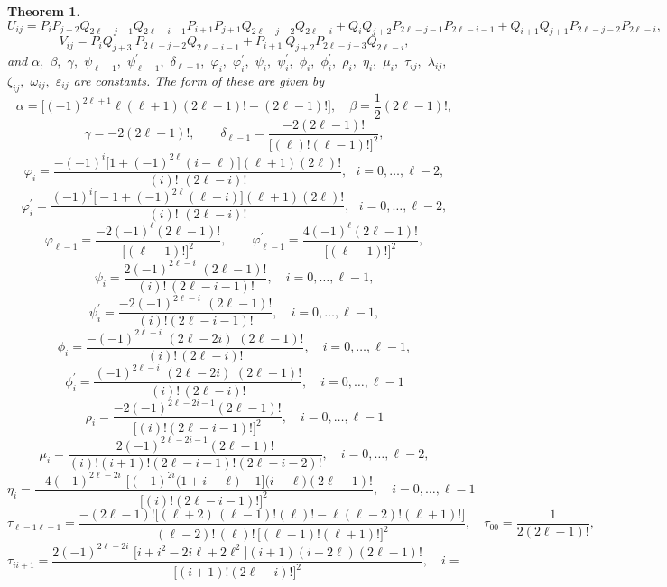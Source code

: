 \documentclass[12pt]{article}
\newtheorem{thm}{Theorem}
\begin{document}
\begin{thm}
$$$$
$$
U_{ij}=P_{i} P_{j+2}  Q_{2\ell-j-1} Q_{2\ell-i-1} 
P_{i+1} P_{j+1} Q_{2\ell-j-2} Q_{2\ell-i}+ Q_{i} Q_{j+2} P_{2\ell-j-1} P_{2\ell-i-1} 
+ Q_{i+1} Q_{j+1} P_{2\ell-j-2} P_{2\ell-i}, 
$$
$$
V_{ij}=P_{i} Q_{j+3} \ P_{2\ell-j-2} Q_{2\ell-i-1} +P_{i+1} \ Q_{j+2} P_{2\ell-j-3} Q_{2\ell-i}, 
$$
and
$\alpha,$ $\beta,$ $\gamma,$ $\psi_{\ell -1},$ $\psi^{'}_{\ell -1},$ $
	\delta_{\ell -1},$ $\varphi_{i},$ $\varphi^{'}_{i},$ $\psi_{i},$
	$\psi^{'}_{i},$ $\phi_{i},$ $\phi^{'}_{i},$ $\rho_{i},$ $\eta_{i},$
	$\mu_{i},$ $\tau_{ij},$ $\lambda_{ij},$ $\zeta_{ij},$ $\omega_{ij},$
	$\varepsilon_{ij}$ are constants. The form of these are given by 
$$
 \alpha = \Big[  (-1)^{2\ell+1} \ell(\ell+1) (2\ell-1)!-(2\ell-1)!  \Big], \quad  \beta = \frac{1}{2}   (2\ell-1)!,
	$$
	$$
 \gamma = -2  (2\ell-1)! , \qquad \delta_{\ell-1} =\frac{ -2 (2\ell-1)! }{\Big [(\ell)!(\ell-1)!\Big]^2} , 
$$
$$
   \varphi_{i}= \frac{ -(-1)^{i} \Big[ 1+(-1)^{2\ell}(i-\ell)  \Big](\ell+1)
	(2\ell)! }{ (i)!\,\, (2\ell-i)!},\,\,\,\,  i= 0,\ldots, \ell-2,  
$$
$$
   \varphi^{'}_{i}= \frac{ (-1)^{i} \Big[ -1+(-1)^{2\ell}(\ell-i)
   \Big](\ell+1)  (2\ell)!}{ (i)!\,\, (2\ell-i)!},\,\,\,\,  i= 0,\ldots, \ell-2,
   $$
   $$
   \varphi_{\ell-1} =\frac{ -2(-1)^{\ell} (2\ell-1)! }{\Big [(\ell-1)!\Big]^2} ,\qquad   \varphi^{'}_{\ell-1} =\frac{ 4(-1)^{\ell} (2\ell-1)! }{\Big [(\ell-1)!\Big]^2},
    $$
    $$
    \psi_{i} = \frac{  2(-1)^{2\ell-i}\,\,(2\ell-1)!
    }{(i)!\,(2\ell-i-1)!},\quad   i= 0,\ldots, \ell-1, 
    $$
    $$
 \psi^{'}_{i} = \frac{ - 2(-1)^{2\ell-i}\,\ (2\ell-1)!
 }{(i)!(2\ell-i-1)!},\quad   i= 0,\ldots, \ell-1, 
 $$
 $$
  \phi_{i}=\frac{  -(-1)^{2\ell-i}\,\,(2\ell-2i)\,\,(2\ell-1)!
  }{(i)!\,(2\ell-i)!},\quad   i= 0,\ldots, \ell-1 ,
  $$
  $$
   \phi^{'}_{i}=\frac{  (-1)^{2\ell-i}\,\,(2\ell-2i)\,\,(2\ell-1)!
   }{(i)!\,(2\ell-i)!}, \quad i= 0,\ldots, \ell-1 
   $$
   $$
\rho_{i}=\frac{ -2 (-1)^{2\ell-2i-1}(2\ell-1)! }{ \Big [
	(i)!(2\ell-i-1)!\Big]^2},\quad  i= 0,\ldots, \ell-1 
$$
$$
   \mu_{i} =\frac{ 2 (-1)^{2\ell-2i-1}(2\ell-1)!
   }{(i)!(i+1)!(2\ell-i-1)!(2\ell-i-2)!}, \quad  i= 0,\ldots, \ell-2,
$$
$$
  \eta_{i}= \frac{  -4(-1)^{2\ell-2i}\,\, \Big[ (-1)^{2i}
  \big(1+i-\ell\big)-1\Big] \big(i-\ell \big)(2\ell-1)! }{ \Big [
	  (i)!(2\ell-i-1)!\Big]^2},\quad  i= 0,\ldots, \ell-1 
$$
$$
  \tau_{\ell-1\ell-1}= \frac{  -(2\ell-1)!\Big[ (\ell+2)\,(\ell-1)! (\ell)!- \ell  (\ell-2)! (\ell+1)! \Big] }{(\ell-2)!\,(\ell)!\,\Big [(\ell-1)!(\ell+1)!\Big]^2}, \quad \tau_{00}=\frac{ 1 }{2(2\ell-1)!},   
$$
$$
  \tau_{ii+1}= \frac{  2(-1)^{2\ell-2i}\,\, \Big[ i+i^2-2i\ell+2\ell^2 \Big]
  (i+1)(i-2\ell)(2\ell-1)! }{ \Big [ (i+1)!(2\ell-i)!\Big]^2},  \quad i=
$$
\end{thm}
\end{document}
